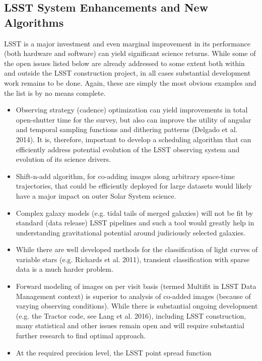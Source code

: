 \documentclass{iau}
\begin{document}
\subsection{LSST System Enhancements and New Algorithms}

LSST is a major investment and even marginal improvement in its
performance (both hardware and software) can yield significant science
returns. While some of the open issues listed below are already
addressed to some extent both within and outside the LSST construction
project, in all cases substantial development work remains to be
done. Again, these are simply the most obvious examples and the list
is by no means complete.

\begin{itemize}
\item Observing strategy (cadence) optimization can yield improvements
  in total open-shutter time for the survey, but also can improve the
  utility of angular and temporal sampling functions and dithering
  patterns (Delgado et al. 2014). It is, therefore, important to
  develop a scheduling algorithm that can efficiently address
  potential evolution of the LSST observing system and evolution of
  its science drivers.
\item Shift-n-add algorithm, for co-adding images along arbitrary
  space-time trajectories, that could be efficiently deployed for
  large datasets would likely have a major impact on outer Solar
  System science.
\item Complex galaxy models (e.g. tidal tails of merged galaxies) will
  not be fit by standard (data release) LSST pipelines and such a tool
  would greatly help in understanding gravitational potential around
  judiciously selected galaxies.
\item While there are well developed methods for the classification of light curves of variable stars
(e.g. Richards et al. 2011), transient classification with sparse data is a much harder problem. 
\item Forward modeling of images on per visit basis (termed Multifit
  in LSST Data Management context) is superior to analysis of co-added
  images (because of varying observing conditions). While there is
  substantial ongoing development (e.g. the Tractor code, see Lang et
  al. 2016), including LSST construction, many statistical and other
  issues remain open and will require substantial further research to
  find optimal approach.
\item At the required precision level, the LSST point spread function

\end{itemize}
\end{document}
